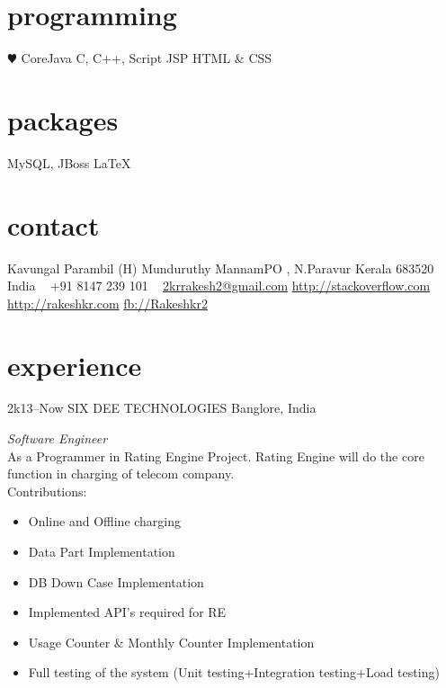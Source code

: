 \documentclass[]{friggeri-cv} %
\begin{document}


\begin{aside} %

\section{programming}
{\color{red} $\varheartsuit$} CoreJava
C, C++, Script
JSP
HTML \& CSS
\section{packages}
MySQL, JBoss
\LaTeX
\section{contact}
Kavungal Parambil (H)
Munduruthy
MannamPO , N.Paravur Kerala 683520
India
~
+91 8147 239 101
~
\href{mailto:2krrakesh2@gmail.com}{2krrakesh2@gmail.com}
\href{http://stackoverflow.com/users/2628956/rakesh-kr}{http://stackoverflow.com}
\href{http://rakeshkr.com}{http://rakeshkr.com}
\href{http://facebook.com/rakeshkr2}{fb://Rakeshkr2}
\end{aside}



\section{experience}

\begin{entrylist}
\entry
{2k13--Now}
{SIX DEE TECHNOLOGIES}
{Banglore, India}
{\emph{Software Engineer} \\
As a Programmer in Rating Engine Project. Rating Engine will do the core function in charging of telecom company.\\
Contributions:
\begin{itemize}
\item Online and Offline charging
\item Data Part Implementation
\item DB Down Case Implementation
\item Implemented API's required for RE  
\item Usage Counter \& Monthly Counter Implementation
\item Full testing of the system (Unit testing+Integration testing+Load testing)
\end{itemize}}


\end{entrylist}
\end{document}
